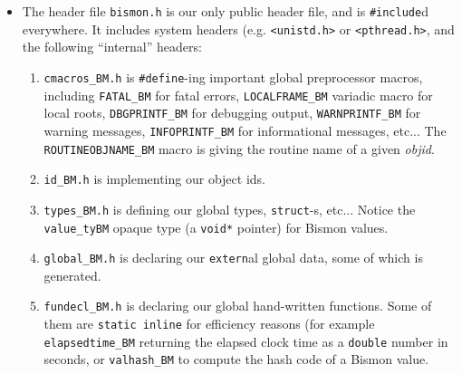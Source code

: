 \begin{itemize}
  \item The header file \texttt{bismon.h} is our
     only public header file,
    and is \texttt{\#include}d everywhere. It includes system headers
    (e.g. \texttt{<unistd.h>} or \texttt{<pthread.h>}, and the
    following ``internal'' headers:
    \begin{enumerate}
      \item \texttt{cmacros\_BM.h} is \texttt{\#define}-ing important
         global
        preprocessor macros, including \texttt{FATAL\_BM} for fatal
        errors, \texttt{LOCALFRAME\_BM} variadic macro for local
        roots, \texttt{DBGPRINTF\_BM} for debugging output,
        \texttt{WARNPRINTF\_BM} for warning messages,
        \texttt{INFOPRINTF\_BM} for informational messages, etc... The
        \texttt{ROUTINEOBJNAME\_BM} macro
        is giving the routine name of  a given
        \textit{objid}.

      \item \texttt{id\_BM.h} is implementing
         our object ids.

      \item \texttt{types\_BM.h} is defining our global types,
        \texttt{struct}-s, etc... Notice the \texttt{value\_tyBM}
        opaque type (a \texttt{void*} pointer) for Bismon values.

        \item \texttt{global\_BM.h} is declaring our \texttt{extern}al
           global data,
          some of which is generated. 
        \item \texttt{fundecl\_BM.h} is declaring our global
           hand-written functions. Some of them are
          \texttt{static inline} for efficiency reasons (for example
           
          \texttt{elapsedtime\_BM} returning the elapsed clock time as
          a \texttt{double} number in seconds, or \texttt{valhash\_BM}
          to compute the hash code of a Bismon value.


\end{enumerate}
\end{itemize}
